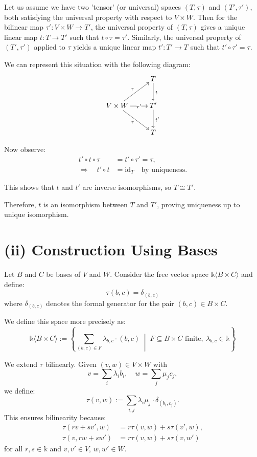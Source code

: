 \documentclass[10pt]{tufte-handout}
\begin{document}
Let us assume we have two 'tensor' (or universal) spaces $(T, \tau)$ and $(T', \tau')$, both satisfying the universal property with respect to $V \times W$. Then for the bilinear map $\tau' : V \times W \to T'$, the universal property of $(T, \tau)$ gives a unique linear map $t : T \to T'$ such that $t \circ \tau = \tau'$. Similarly, the universal property of $(T', \tau')$ applied to $\tau$ yields a unique linear map $t' : T' \to T$ such that $t' \circ \tau' = \tau$.

We can represent this situation with the following diagram:
\[
\xymatrix{
& T \ar[d]^{t} \\
V \times W \ar[ur]^{\tau} \ar[r]|-{\tau'} \ar[dr]_{\tau} & T' \ar[d]^{t'} \\
& T
}
\]



Now observe:
\begin{align*}
    t' \circ t \circ \tau &= t' \circ \tau' = \tau, \\
    \Rightarrow\quad t' \circ t &= \mathrm{id}_T \quad \text{by uniqueness.} 
\end{align*}

This shows that $t$ and $t'$ are inverse isomorphisms, so $T \cong T'$.


Therefore, $t$ is an isomorphism between $T$ and $T'$, proving uniqueness up to unique isomorphism.

\section{(ii) Construction Using Bases}
Let $B$ and $C$ be bases of $V$ and $W$. Consider the free vector space $\mathds{k}\langle B \times C \rangle$ and define:
\[ \tau(b, c) = \delta_{(b, c)} \]
where $\delta_{(b,c)}$ denotes the formal generator for the pair $(b, c) \in B \times C$.

We define this space more precisely as:
\[
\mathds{k}\langle B \times C \rangle := \left\{ \sum_{(b, c) \in F} \lambda_{b,c} \cdot (b, c) \;\middle|\; F \subseteq B \times C \text{ finite},\ \lambda_{b,c} \in \mathds{k} \right\}
\]

We extend $\tau$ bilinearly. Given $(v,w) \in V \times W$ with
\[
   v = \sum_i \lambda_i b_i, \quad w = \sum_j \mu_j c_j,
\]
we define:
\[ \tau(v,w) := \sum_{i,j} \lambda_i \mu_j \cdot \delta_{(b_i, c_j)}. \]
This ensures bilinearity because:
\begin{align*}
   \tau(rv + sv', w) &= r\tau(v,w) + s\tau(v',w), \\
   \tau(v, rw + sw') &= r\tau(v,w) + s\tau(v,w')
\end{align*}
for all $r,s \in \mathds{k}$ and $v,v' \in V$, $w,w' \in W$.
\end{document}
